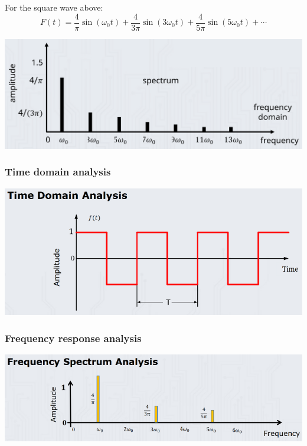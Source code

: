 \documentclass[11pt]{article}
\begin{document}
For the square wave above:
\[F(t) = \frac{4}{\pi} \sin(\omega_0 t) + \frac{4}{3 \pi} \sin (3 \omega_0 t) + \frac{4}{5 \pi} \sin (5 \omega_0 t) + \cdots\]

\begin{center}
\includegraphics[width=.9\linewidth]{./images/square-wave-signal-frequency-spectrum.png}
\end{center}
\subsubsection{Time domain analysis}
\label{sec:orge3e998c}
\begin{center}
\includegraphics[width=.9\linewidth]{./images/time-domain-analysis.png}
\end{center}
\subsubsection{Frequency response analysis}
\label{sec:org2342022}
\begin{center}
\includegraphics[width=.9\linewidth]{./images/frequency-spectrum-analysis.png}
\end{center}
\end{document}
